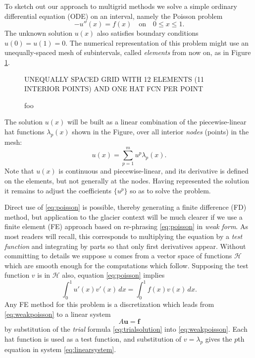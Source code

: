 \documentclass[letterpaper,final,12pt,reqno]{amsart}
\newcommand{\bbf}{\mathbf{f}}
\newcommand{\bu}{\mathbf{u}}
\begin{document}
To sketch out our approach to multigrid methods we solve a simple ordinary differential equation (ODE) on an interval, namely the Poisson problem
\begin{equation}
- u''(x) = f(x) \quad \text{on} \quad 0 \le x \le 1. \label{eq:poisson}
\end{equation}
The unknown solution $u(x)$ also satisfies boundary conditions $u(0)=u(1)=0$.  The numerical representation of this problem might use an unequally-spaced mesh of subintervals, called \emph{elements} from now on, as in Figure \ref{fig:finehats}.

\begin{figure}
UNEQUALLY SPACED GRID WITH 12 ELEMENTS (11 INTERIOR POINTS) AND ONE HAT FCN PER POINT
\caption{foo}
\label{fig:finehats}
\end{figure}

The solution $u(x)$ will be built as a linear combination of the piecewise-linear hat functions $\lambda_p(x)$ shown in the Figure, over all interior \emph{nodes} (points) in the mesh:
\begin{equation}
u(x) = \sum_{p=1}^m u^p \lambda_p(x). \label{eq:trialsolution}
\end{equation}
Note that $u(x)$ is continuous and piecewise-linear, and its derivative is defined on the elements, but not generally at the nodes.  Having represented the solution it remains to adjust the coefficients $\{u^p\}$ so as to solve the problem.

Direct use of \eqref{eq:poisson} is possible, thereby generating a finite difference (FD) method, but application to the glacier context will be much clearer if we use a finite element (FE) approach based on re-phrasing \eqref{eq:poisson} in \emph{weak form}.  As most readers will recall, this corresponds to multiplying the equation by a \emph{test function} and integrating by parts so that only first derivatives appear.  Without committing to details we suppose $u$ comes from a vector space of functions $\mathcal{H}$ which are smooth enough for the computations which follow.  Supposing the test function $v$ is in $\mathcal{H}$ also, equation \eqref{eq:poisson} implies
\begin{equation}
\int_0^1 u'(x) v'(x)\,dx = \int_0^1 f(x) v(x)\, dx.
\label{eq:weakpoisson}
\end{equation}
Any FE method for this problem is a discretization which leads from \eqref{eq:weakpoisson} to a linear system
\begin{equation}
A \bu = \bbf \label{eq:linearsystem}
\end{equation}
by substitution of the \emph{trial} formula \eqref{eq:trialsolution} into \eqref{eq:weakpoisson}.  Each hat function is used as a test function, and substitution of $v=\lambda_p$ gives the $p$th equation in system \eqref{eq:linearsystem}.
\end{document}
